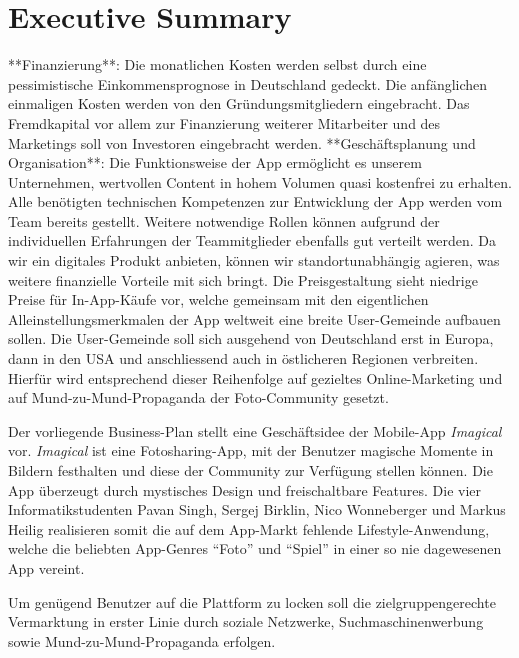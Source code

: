 \chapter{Executive Summary}



**Finanzierung**: Die monatlichen Kosten werden selbst durch eine pessimistische Einkommensprognose in Deutschland gedeckt. Die anfänglichen einmaligen Kosten werden von den Gründungsmitgliedern eingebracht. Das Fremdkapital vor allem zur Finanzierung weiterer Mitarbeiter und des Marketings soll von Investoren eingebracht werden.
**Geschäftsplanung und Organisation**: Die Funktionsweise der App ermöglicht es unserem Unternehmen, wertvollen Content in hohem Volumen quasi kostenfrei zu erhalten. Alle benötigten technischen Kompetenzen zur Entwicklung der App werden vom Team bereits gestellt. Weitere notwendige Rollen können aufgrund der individuellen Erfahrungen der Teammitglieder ebenfalls gut verteilt werden. Da wir ein digitales Produkt anbieten, können wir standortunabhängig agieren, was weitere finanzielle Vorteile mit sich bringt.
Die Preisgestaltung sieht niedrige Preise für In-App-Käufe vor, welche gemeinsam mit den eigentlichen Alleinstellungsmerkmalen der App weltweit eine breite User-Gemeinde aufbauen sollen. Die User-Gemeinde soll sich ausgehend von Deutschland erst in Europa, dann in den USA und anschliessend auch in östlicheren Regionen verbreiten. Hierfür wird entsprechend dieser Reihenfolge auf gezieltes Online-Marketing und auf Mund-zu-Mund-Propaganda der Foto-Community gesetzt.


Der vorliegende Business-Plan stellt eine Geschäftsidee der Mobile-App \textit{Imagical} vor.
\textit{Imagical} ist eine Fotosharing-App, mit der Benutzer magische Momente in Bildern festhalten und diese der Community zur Verfügung stellen können. 
Die App überzeugt durch mystisches Design und freischaltbare Features.
Die vier Informatikstudenten Pavan Singh, Sergej Birklin, Nico Wonneberger und Markus Heilig realisieren somit die auf dem App-Markt fehlende Lifestyle-Anwendung, welche die beliebten App-Genres ``Foto'' und ``Spiel'' in einer so nie dagewesenen App vereint.

Um genügend Benutzer auf die Plattform zu locken soll die zielgruppengerechte Vermarktung in erster Linie durch soziale Netzwerke, Suchmaschinenwerbung sowie Mund-zu-Mund-Propaganda erfolgen. 
